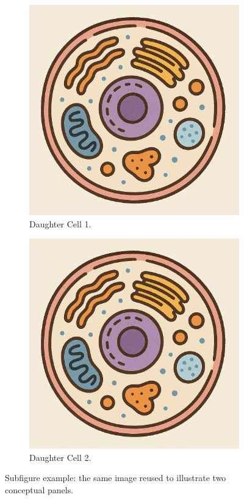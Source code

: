 \begin{figure}[h]
  \centering
  \begin{subfigure}{0.48\textwidth}
    \centering
    \includegraphics[width=\linewidth]{figures/cell.png}
    \caption{Daughter Cell 1.}
    \label{fig:cell-sub-a}
  \end{subfigure}\hfill
  \begin{subfigure}{0.48\textwidth}
    \centering
    \includegraphics[width=\linewidth]{figures/cell.png}
    \caption{Daughter Cell 2.}
    \label{fig:cell-sub-b}
  \end{subfigure}
  \caption{Subfigure example: the same image reused to illustrate two conceptual panels.}
  \label{fig:cell-subfigures}
\end{figure}